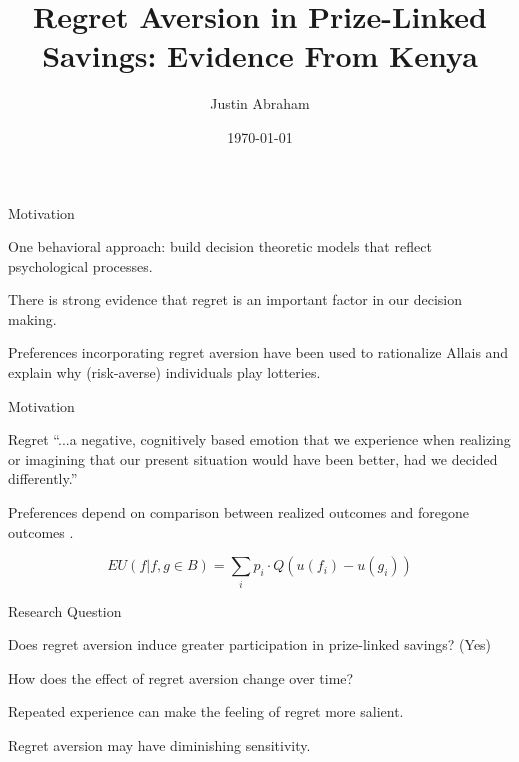 \documentclass[aspectratio=169]{beamer}
\title{Regret Aversion in Prize-Linked Savings: Evidence From Kenya}
\author[Abraham]{Justin Abraham}
\institute{University of California, San Diego}
\date{\today}
\newenvironment{wideitemize}{\itemize\addtolength{\itemsep}{10pt}}{\enditemize}
\newenvironment{wideenumerate}{\enumerate\addtolength{\itemsep}{10pt}}{\endenumerate}
\begin{document}
\begin{frame}
	\titlepage
\end{frame}

\begin{frame}{Motivation}

	\begin{wideitemize}

		\item One behavioral approach: build decision theoretic models that reflect psychological processes.

		\item There is strong evidence that regret is an important factor in our decision making.

		\item Preferences incorporating regret aversion have been used to rationalize Allais and explain why (risk-averse) individuals play lotteries.

	\end{wideitemize}

\end{frame}

\begin{frame}{Motivation}

	\begin{block}{Regret}
	 ``...a negative, cognitively based emotion that we experience when realizing or imagining that our present situation would have been better, had we decided differently.''
	\end{block}

	Preferences depend on comparison between realized outcomes and foregone outcomes \parencite{bell_risk_1983,loomes_regret_1982}. 

	\[ EU(f | f, g \in B) =  \sum_i p_{i} \cdot Q\left(u\left(f_{i}\right)-u\left(g_{i}\right)\right) \]
	
\end{frame}

\begin{frame}{Research Question}

	\begin{wideitemize}

		\item Does regret aversion induce greater participation in prize-linked savings? (Yes)
		\item How does the effect of regret aversion change over time?

			\begin{wideenumerate}
				\item Repeated experience can make the feeling of regret more salient.
				\item Regret aversion may have diminishing sensitivity.
			\end{wideenumerate}

	\end{wideitemize}

\end{frame}
\end{document}
